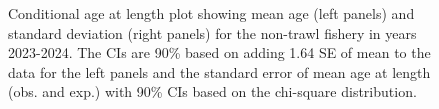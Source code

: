 \documentclass[
]{scrartcl}
\begin{document}
\begin{figure}[H]


\caption{\label{fig-call-plot-midt2}Conditional age at length plot
showing mean age (left panels) and standard deviation (right panels) for
the non-trawl fishery in years 2023-2024. The CIs are 90\% based on
adding 1.64 SE of mean to the data for the left panels and the standard
error of mean age at length (obs. and exp.) with 90\% CIs based on the
chi-square distribution.}

\end{figure}%
\end{document}
